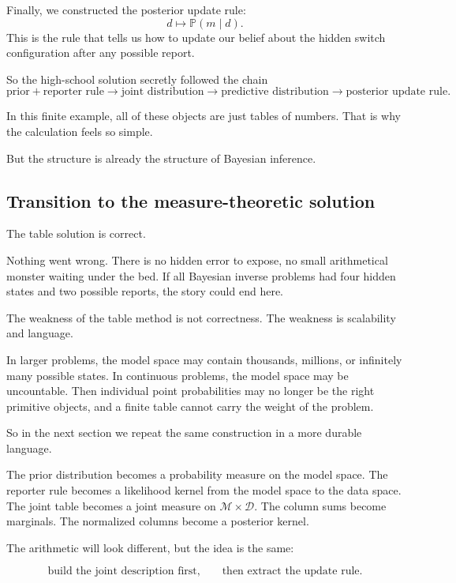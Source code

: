 \documentclass[11pt]{article}
\newcommand{\M}{\mathcal{M}}
\newcommand{\D}{\mathcal{D}}
\begin{document}
Finally, we constructed the posterior update rule:
\[
    d \longmapsto \mathbb{P}(m\mid d).
\]
This is the rule that tells us how to update our belief about the hidden switch configuration after any possible report.

So the high-school solution secretly followed the chain
\[
    \text{prior}
    +
    \text{reporter rule}
    \longrightarrow
    \text{joint distribution}
    \longrightarrow
    \text{predictive distribution}
    \longrightarrow
    \text{posterior update rule}.
\]

In this finite example, all of these objects are just tables of numbers. That is why the calculation feels so simple.

But the structure is already the structure of Bayesian inference.

\subsection{Transition to the measure-theoretic solution}

The table solution is correct.

Nothing went wrong. There is no hidden error to expose, no small arithmetical monster waiting under the bed. If all Bayesian inverse problems had four hidden states and two possible reports, the story could end here.

The weakness of the table method is not correctness. The weakness is scalability and language.

In larger problems, the model space may contain thousands, millions, or infinitely many possible states. In continuous problems, the model space may be uncountable. Then individual point probabilities may no longer be the right primitive objects, and a finite table cannot carry the weight of the problem.

So in the next section we repeat the same construction in a more durable language.

The prior distribution becomes a probability measure on the model space. The reporter rule becomes a likelihood kernel from the model space to the data space. The joint table becomes a joint measure on \(\M\times\D\). The column sums become marginals. The normalized columns become a posterior kernel.

The arithmetic will look different, but the idea is the same:

\[
    \text{build the joint description first,}
    \qquad
    \text{then extract the update rule.}
\]
\end{document}
